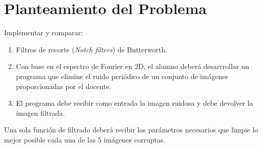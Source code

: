 \section{Planteamiento del Problema}
    Implementar y comparar:
    \begin{enumerate}
        \item Filtros de recorte (\textit{Notch filters}) de Butterworth.
        \item Con base en el espectro de Fourier en 2D, el alumno deberá desarrrollar un programa que elimine el ruido periódico de un conjunto de imágenes  proporcionadas por el docente.
        \item El programa debe recibir como entrada la imagen ruidosa y debe devolver la imagen filtrada.
    \end{enumerate}

    Una sola función de filtrado deberá recibir los parámetros necesarios que 
    limpie lo mejor posible cada una de las 5 imágenes corruptas.    